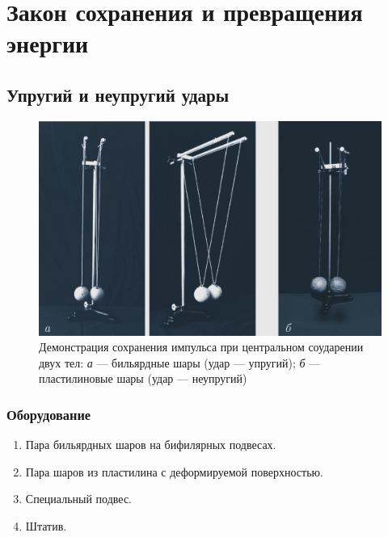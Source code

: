 \documentclass[All.tex]{subfiles}
\begin{document}
	
	
\chapter{\textcolor{PineGreen}{Закон сохранения и превращения энергии}}
		\section{Упругий и неупругий удары}

	
	\begin{figure}[H] 	%
		\centering 	
		\includegraphics[width=0.9\linewidth]{hit-1.png}
		\caption{Демонстрация сохранения импульса при центральном соударении двух тел: \textit{а} — бильярдные шары (удар — упругий); \textit{б} — пластилиновые шары (удар — неупругий)}
		\label{hit-1}
	\end{figure}
	
	\subsection*{\textcolor{PineGreen}{Оборудование}}
	
	\begin{enumerate} 
		\item Пара бильярдных шаров на бифилярных подвесах.
		\item Пара шаров из пластилина с деформируемой поверхностью.
		\item Специальный подвес.
		\item Штатив.
	\end{enumerate}
\end{document}
